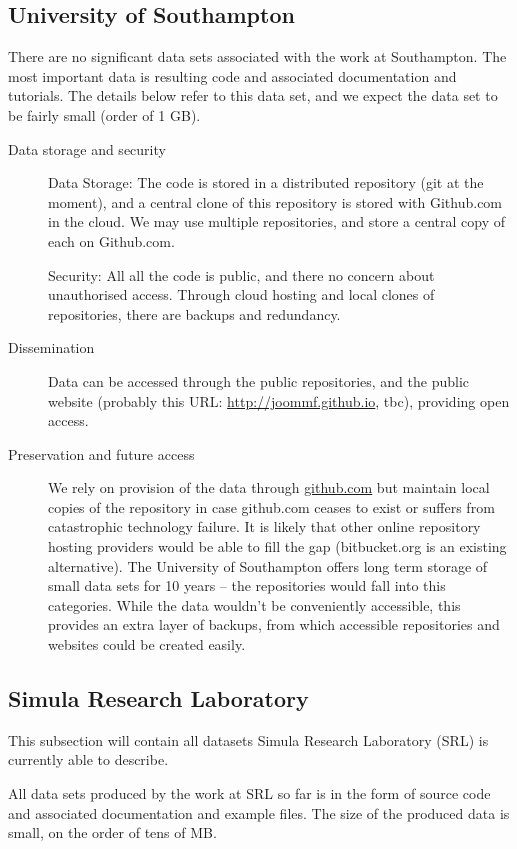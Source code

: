 \documentclass[12pt]{article}
\begin{document}
\subsection{University of Southampton}

There are no significant data sets associated with the work at Southampton. The most important data is resulting code and associated documentation and tutorials. The details below refer to this data set, and we expect the data set to be fairly small (order of 1 GB).
\begin{description}
\item[Data storage and security] Data Storage: The code is stored in a distributed repository (git at the moment), and a central clone of this repository is stored with Github.com in the cloud. We may use multiple repositories, and store a central copy of each on Github.com.

  Security: All all the code is public, and there no concern about unauthorised access. Through cloud hosting and local clones of repositories, there are backups and redundancy.
\item[Dissemination] Data can be accessed through the public repositories, and the public website (probably this URL: \href{http://joommf.github.io}{http://joommf.github.io}, tbc), providing open access.
\item[Preservation and future access] We rely on provision of the data through \href{github.com}{github.com} but maintain local copies of the repository in case github.com ceases to exist or suffers from catastrophic technology failure. It is likely that other online repository hosting providers would be able to fill the gap (bitbucket.org is an existing alternative). The University of Southampton offers long term storage of small data sets for 10 years -- the repositories would fall into this categories. While the data wouldn't be conveniently accessible, this provides an extra layer of backups, from which accessible repositories and websites could be created easily.
\end{description}


\subsection{Simula Research Laboratory}

This subsection will contain all datasets Simula Research Laboratory
(SRL) is currently able to describe.

All data sets produced by the work at SRL so far is in the form of
source code and associated documentation and example files.
The size of the produced data is small, on the order of tens of MB.
\end{document}
